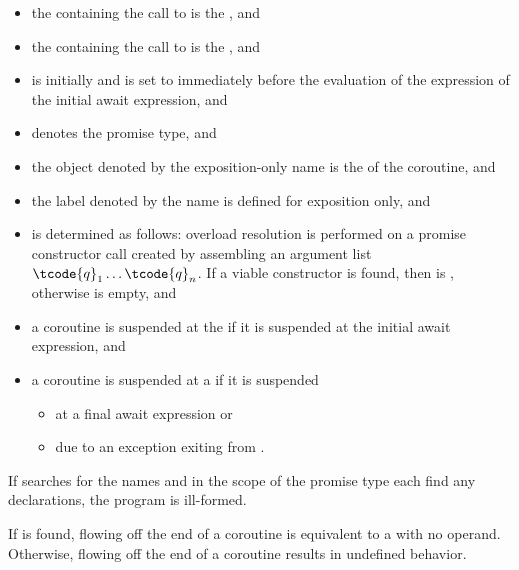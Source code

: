 \begin{itemize}
\item
{}%
the  containing
the call to 
is the , and
\item
the  containing
the call to 
is the , and
\item
{}
is initially  and is set to 
immediately before the evaluation
of the  expression
of the initial await expression, and
\item
{} denotes the promise type, and
\item
the object denoted by the exposition-only name 
is the  of the coroutine, and
\item
the label denoted by the name 
is defined for exposition only, and
\item
{} is determined as follows:
overload resolution is performed on a promise constructor call created by
assembling an argument list $\tcode{q}_1 \dotsc \tcode{q}_n$. If a viable
constructor is found, then
 is
, otherwise
 is empty, and
\item
a coroutine is suspended at the  if
it is suspended at the initial await expression, and
\item
a coroutine is suspended at a  if
it is suspended
\begin{itemize}
\item
at a final await expression or
\item
due to an exception exiting from .
\end{itemize}
\end{itemize}

\pnum
If searches for the names  and 
in the scope of the promise type each find any declarations,
the program is ill-formed.
\begin{note}
If  is found, flowing off
the end of a coroutine is equivalent to a  with no operand.
Otherwise, flowing off the end of a coroutine
results in undefined behavior.
\end{note}

